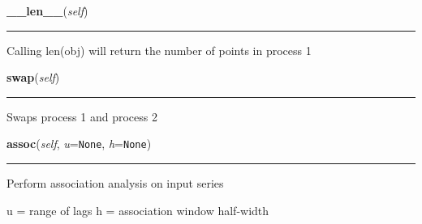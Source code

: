     \label{spacepy:poppy:PPro:__len__}

    \vspace{0.5ex}

\hspace{.8\funcindent}\begin{boxedminipage}{\funcwidth}

    \raggedright \textbf{\_\_len\_\_}(\textit{self})

    \vspace{-1.5ex}

    \rule{\textwidth}{0.5\fboxrule}
\setlength{\parskip}{2ex}
    Calling len(obj) will return the number of points in process 1

\setlength{\parskip}{1ex}
    \end{boxedminipage}

    \label{spacepy:poppy:PPro:swap}

    \vspace{0.5ex}

\hspace{.8\funcindent}\begin{boxedminipage}{\funcwidth}

    \raggedright \textbf{swap}(\textit{self})

    \vspace{-1.5ex}

    \rule{\textwidth}{0.5\fboxrule}
\setlength{\parskip}{2ex}
    Swaps process 1 and process 2

\setlength{\parskip}{1ex}
    \end{boxedminipage}

    \label{spacepy:poppy:PPro:assoc}

    \vspace{0.5ex}

\hspace{.8\funcindent}\begin{boxedminipage}{\funcwidth}

    \raggedright \textbf{assoc}(\textit{self}, \textit{u}={\tt None}, \textit{h}={\tt None})

    \vspace{-1.5ex}

    \rule{\textwidth}{0.5\fboxrule}
\setlength{\parskip}{2ex}
    Perform association analysis on input series

    u = range of lags h = association window half-width

\setlength{\parskip}{1ex}
    \end{boxedminipage}

